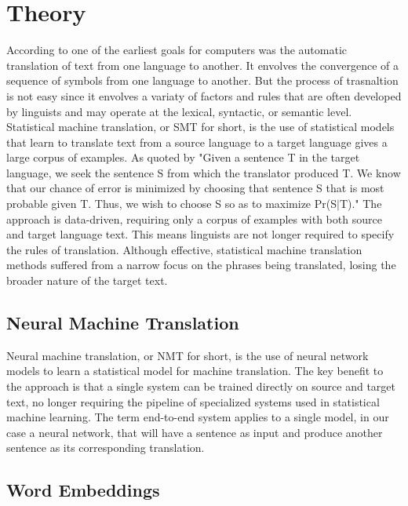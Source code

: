 ﻿\documentclass[conference]{IEEEtran}
\begin{document}
\section{Theory}
According to \cite{gentle} one of the earliest goals for computers was the automatic translation of text from one language to another. It envolves the convergence of a sequence of symbols from one language to another. But the process of trasnaltion is not easy  since it envolves a variaty of factors and rules that are often developed by linguists and may operate at the lexical, syntactic, or semantic level. \\
Statistical machine translation, or SMT for short, is the use of statistical models that learn to translate text from a source language to a target language gives a large corpus of examples. As quoted by \cite{brown} "Given a sentence T in the target language, we seek the sentence S from which the translator produced T. We know that our chance of error is minimized by choosing that sentence S that is most probable given T. Thus, we wish to choose S so as to maximize Pr(S$\vert$T)." The approach is data-driven, requiring only a corpus of examples with both source and target language text. This means linguists are not longer required to specify the rules of translation. Although effective, statistical machine translation methods suffered from a narrow focus on the phrases being translated, losing the broader nature of the target text.\\

\subsection{Neural Machine Translation}

Neural machine translation, or NMT for short, is the use of neural network models to learn a statistical model for machine translation. The key benefit to the approach is that a single system can be trained directly on source and target text, no longer requiring the pipeline of specialized systems used in statistical machine learning. The term end-to-end system applies to a single model, in our case a neural network, that will  have a sentence as input and produce another sentence as its corresponding translation.



\subsection{Word Embeddings}
\end{document}
